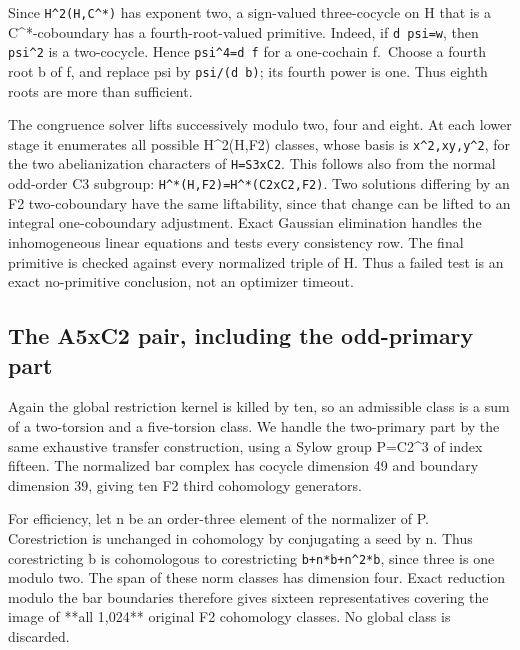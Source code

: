 Since \texttt{H\textasciicircum{}2(H,\allowbreak{}C\textasciicircum{}*)}
has exponent two, a sign-valued three-cocycle on H that is a
C\^{}*-coboundary has a fourth-root-valued primitive. Indeed, if
\texttt{d psi=\allowbreak{}w}, then \texttt{psi\textasciicircum{}2} is a
two-cocycle. Hence \texttt{psi\textasciicircum{}4=\allowbreak{}d f} for
a one-cochain f.~Choose a fourth root b of f, and replace psi by
\texttt{psi/\allowbreak{}(d b)}; its fourth power is one. Thus eighth
roots are more than sufficient.

The congruence solver lifts successively modulo two, four and eight. At
each lower stage it enumerates all possible H\^{}2(H,F2) classes, whose
basis is
\texttt{x\textasciicircum{}2,xy\allowbreak{},y\textasciicircum{}2}, for
the two abelianization characters of \texttt{H=S3xC\allowbreak{}2}. This
follows also from the normal odd-order C3 subgroup:
\texttt{H\textasciicircum{}*(H,\allowbreak{}F2)=H\textasciicircum{}\allowbreak{}*(C2xC\allowbreak{}2,F2)}.
Two solutions differing by an F2 two-coboundary have the same
liftability, since that change can be lifted to an integral
one-coboundary adjustment. Exact Gaussian elimination handles the
inhomogeneous linear equations and tests every consistency row. The
final primitive is checked against every normalized triple of H. Thus a
failed test is an exact no-primitive conclusion, not an optimizer
timeout.

\hypertarget{the-a5xc2-pair-including-the-odd-primary-part}{%
\subsection{The A5xC2 pair, including the odd-primary
part}\label{the-a5xc2-pair-including-the-odd-primary-part}}

Again the global restriction kernel is killed by ten, so an admissible
class is a sum of a two-torsion and a five-torsion class. We handle the
two-primary part by the same exhaustive transfer construction, using a
Sylow group P=C2\^{}3 of index fifteen. The normalized bar complex has
cocycle dimension 49 and boundary dimension 39, giving ten F2 third
cohomology generators.

For efficiency, let n be an order-three element of the normalizer of P.
Corestriction is unchanged in cohomology by conjugating a seed by n.
Thus corestricting b is cohomologous to corestricting
\texttt{b+n*b+\allowbreak{}n\textasciicircum{}2*b}, since three is one
modulo two. The span of these norm classes has dimension four. Exact
reduction modulo the bar boundaries therefore gives sixteen
representatives covering the image of **all 1,024** original F2
cohomology classes. No global class is discarded.

